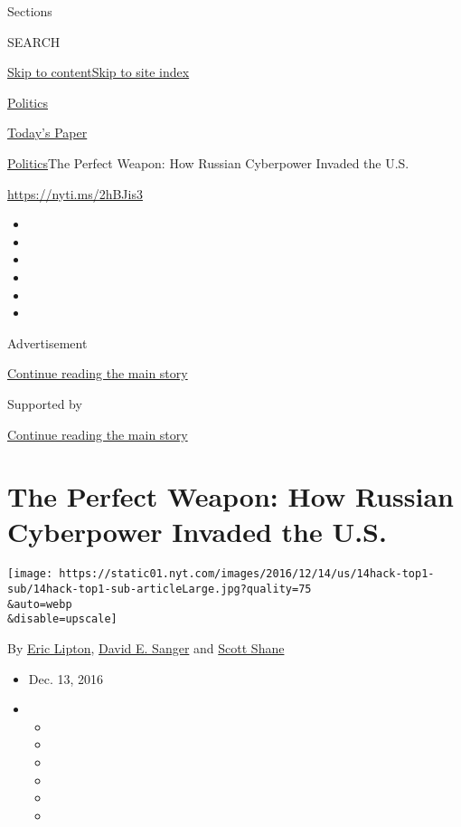 Sections

SEARCH

\protect\hyperlink{site-content}{Skip to
content}\protect\hyperlink{site-index}{Skip to site index}

\href{https://www.nytimes.com/section/politics}{Politics}

\href{https://myaccount.nytimes.com/auth/login?response_type=cookie\&client_id=vi}{}

\href{https://www.nytimes.com/section/todayspaper}{Today's Paper}

\href{/section/politics}{Politics}\textbar{}The Perfect Weapon: How
Russian Cyberpower Invaded the U.S.

\url{https://nyti.ms/2hBJis3}

\begin{itemize}
\item
\item
\item
\item
\item
\item
\end{itemize}

Advertisement

\protect\hyperlink{after-top}{Continue reading the main story}

Supported by

\protect\hyperlink{after-sponsor}{Continue reading the main story}

\hypertarget{the-perfect-weapon-how-russian-cyberpower-invaded-the-us}{%
\section{The Perfect Weapon: How Russian Cyberpower Invaded the
U.S.}\label{the-perfect-weapon-how-russian-cyberpower-invaded-the-us}}

\texttt{[image: https://static01.nyt.com/images/2016/12/14/us/14hack-top1-sub/14hack-top1-sub-articleLarge.jpg?quality=75\\\&auto=webp\\\&disable=upscale]}

By \href{https://www.nytimes.com/by/eric-lipton}{Eric Lipton},
\href{https://www.nytimes.com/by/david-e-sanger}{David E. Sanger} and
\href{https://www.nytimes.com/by/scott-shane}{Scott Shane}

\begin{itemize}
\item
  Dec. 13, 2016
\item
  \begin{itemize}
  \item
  \item
  \item
  \item
  \item
  \item
  \end{itemize}
\end{itemize}

